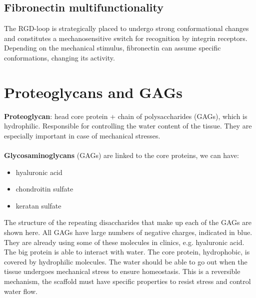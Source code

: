 \subsection{Fibronectin multifunctionality}
The RGD-loop is strategically placed to undergo strong conformational changes and constitutes a mechanosensitive switch for recognition by integrin receptors. 
Depending on the mechanical stimulus, fibronectin can assume specific conformations, changing its activity.

\section{Proteoglycans and GAGs}

\textbf{Proteoglycan}: head core protein + chain of polysaccharides (GAGs), which is hydrophilic. Responsible for controlling the water content of the tissue. 
They are especially important in case of mechanical stresses.
\\
\\
\noindent
\textbf{Glycosaminoglycans} (GAGs) are linked to the core proteins, we can have:
\begin{itemize}
\item hyaluronic acid
\item chondroitin sulfate
\item keratan sulfate
\end{itemize}
\noindent
The structure of the repeating disaccharides that make up each of the GAGs are shown here. 
All GAGs have large numbers of negative charges, indicated in blue.
They are already using some of these molecules in clinics, e.g. hyaluronic acid. 
The big protein is able to interact with water. 
The core protein, hydrophobic, is covered by hydrophilic molecules. 
The water should be able to go out when the tissue undergoes mechanical stress to ensure homeostasis.
This is a reversible mechanism,  the scaffold must have specific properties to resist stress and control water flow.

